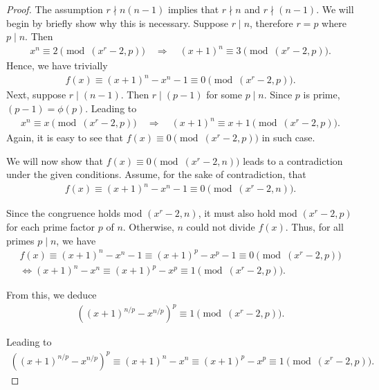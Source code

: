\documentclass{article}
\theoremstyle{plain}
\theoremstyle{definition}
\begin{document}
\begin{proof}
The assumption $r \nmid n (n-1)$ implies that $r \nmid n$ and $r \nmid (n-1)$. We will begin by briefly show why this is necessary. Suppose $r \mid n$, therefore $r = p$ where $p \mid n$. Then
\begin{align*}
    x^n \equiv 2 \pmod{(x^r-2, p)}
    \quad \Longrightarrow \quad
    (x+1)^n \equiv 3 \pmod{(x^r-2, p)} .
\end{align*}
Hence, we have trivially
\begin{align*}
    f(x) \equiv (x+1)^n - x^n - 1 \equiv 0 \pmod{(x^r-2, p)} .
\end{align*}
Next, suppose $r \mid (n-1)$. Then $r \mid (p-1)$ for some $p \mid n$. Since $p$ is prime, $(p-1) = \phi(p)$. Leading to
\begin{align*}
    x^n \equiv x \pmod{(x^r-2, p)}
    \quad \Longrightarrow \quad
    (x+1)^n \equiv x+1 \pmod{(x^r-2, p)} .
\end{align*}
Again, it is easy to see that $f(x) \equiv 0 \pmod{(x^r-2, p)}$ in such case.

We will now show that $f(x) \equiv 0 \pmod{(x^r-2, n)}$ leads to a contradiction under the given conditions. Assume, for the sake of contradiction, that
\begin{align*}
    f(x) \equiv (x+1)^n - x^n - 1 \equiv 0 \pmod{(x^r-2, n)} .
\end{align*}

Since the congruence holds mod $(x^r-2, n)$, it must also hold mod $(x^r-2, p)$ for each prime factor $p$ of $n$. Otherwise, $n$ could not divide $f(x)$. Thus, for all primes $p \mid n$, we have
\begin{align*}
f(x) \equiv (x+1)^n - x^n - 1 \equiv (x+1)^p - x^p - 1 \equiv 0 \pmod{(x^r-2, p)} \\
\Longleftrightarrow (x+1)^n - x^n \equiv (x+1)^p - x^p \equiv 1 \pmod{(x^r-2, p)} .
\end{align*}

From this, we deduce
\begin{align*}
\left( (x+1)^{n/p} - x^{n/p} \right)^p \equiv 1 \pmod{(x^r-2, p)} .
\end{align*}

Leading to
\begin{align*}
\left( (x+1)^{n/p} - x^{n/p} \right)^p \equiv (x+1)^n - x^n \equiv (x+1)^p - x^p \equiv 1 \pmod{(x^r-2, p)} .
\end{align*}


\end{proof}
\end{document}
